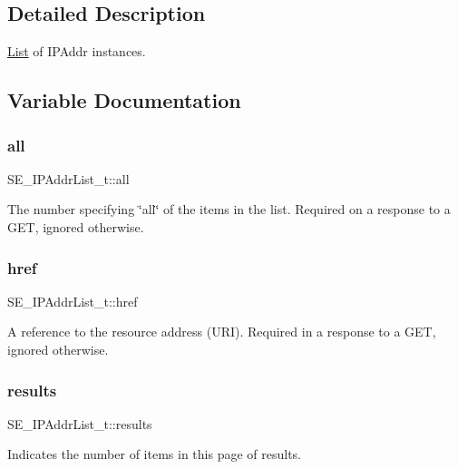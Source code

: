 \subsection{Detailed Description}
\hyperlink{structList}{List} of I\+P\+Addr instances. 

\subsection{Variable Documentation}
\mbox{\label{group__IPAddrList_gae540628e2b65249a48eac12cfc45ee6e}} 
\subsubsection{\texorpdfstring{all}{all}}
{\footnotesize\ttfamily S\+E\+\_\+\+I\+P\+Addr\+List\+\_\+t\+::all}

The number specifying \char`\"{}all\char`\"{} of the items in the list. Required on a response to a G\+ET, ignored otherwise. \mbox{\label{group__IPAddrList_ga4c7cdf66f95fb3279369ecfe722484ac}} 
\subsubsection{\texorpdfstring{href}{href}}
{\footnotesize\ttfamily S\+E\+\_\+\+I\+P\+Addr\+List\+\_\+t\+::href}

A reference to the resource address (U\+RI). Required in a response to a G\+ET, ignored otherwise. \mbox{\label{group__IPAddrList_ga494d254730f745fc2e82ea322a4fd81f}} 
\subsubsection{\texorpdfstring{results}{results}}
{\footnotesize\ttfamily S\+E\+\_\+\+I\+P\+Addr\+List\+\_\+t\+::results}

Indicates the number of items in this page of results. 